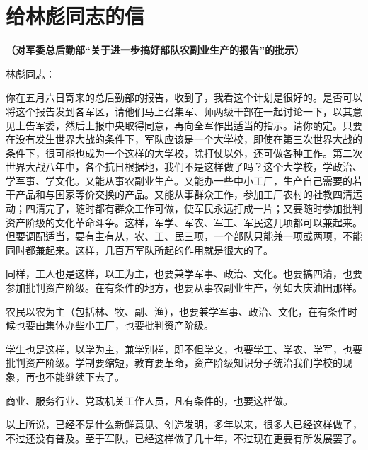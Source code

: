 \section[给林彪同志的信（对军委总后勤部“关于进一步搞好部队农副业生产的报告”的批示）（一九六六年五月七日）]{给林彪同志的信}
\textbf{\centering（对军委总后勤部“关于进一步搞好部队农副业生产的报告”的批示）}



\noindent 林彪同志：

你在五月六日寄来的总后勤部的报告，收到了，我看这个计划是很好的。是否可以将这个报告发到各军区，请他们马上召集军、师两级干部在一起讨论一下，以其意见上告军委，然后上报中央取得同意，再向全军作出适当的指示。请你酌定。只要在没有发生世界大战的条件下，军队应该是一个大学校，即使在第三次世界大战的条件下，很可能也成为一个这样的大学校，除打仗以外，还可做各种工作。第二次世界大战八年中，各个抗日根据地，我们不是这样做了吗？这个大学校，学政治、学军事、学文化。又能从事农副业生产。又能办一些中小工厂，生产自己需要的若干产品和与国家等价交换的产品。又能从事群众工作，参加工厂农村的社教四清运动；四清完了，随时都有群众工作可做，使军民永远打成一片；又要随时参加批判资产阶级的文化革命斗争。这样，军学、军农、军工、军民这几项都可以兼起来。但要调配适当，要有主有从，农、工、民三项，一个部队只能兼一项或两项，不能同时都兼起来。这样，几百万军队所起的作用就是很大的了。

同样，工人也是这样，以工为主，也要兼学军事、政治、文化。也要搞四清，也要参加批判资产阶级。在有条件的地方，也要从事农副业生产，例如大庆油田那样。

农民以农为主（包括林、牧、副、渔），也要兼学军事、政治、文化，在有条件时候也要由集体办些小工厂，也要批判资产阶级。

学生也是这样，以学为主，兼学别样，即不但学文，也要学工、学农、学军，也要批判资产阶级。学制要缩短，教育要革命，资产阶级知识分子统治我们学校的现象，再也不能继续下去了。

商业、服务行业、党政机关工作人员，凡有条件的，也要这样做。

以上所说，已经不是什么新鲜意见、创造发明，多年以来，很多人已经这样做了，不过还没有普及。至于军队，已经这样做了几十年，不过现在更要有所发展罢了。


